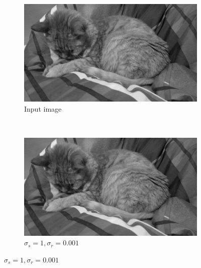 \documentclass[a4spaper]{article}
\begin{document}
\begin{figure}[ht]
	\begin{subfigure}[h]{0.48\textwidth}
		\centering
		\includegraphics[width=\textwidth]{jerry_gray}
		\caption*{Input image}
	\end{subfigure}
	~
	\begin{subfigure}[h]{0.48\textwidth}
	  \centering
	  \includegraphics[width=\textwidth]{jerry_flt_1_0-001}
	  \caption*{$\sigma_s = 1, \sigma_r = 0.001$}
	\end{subfigure}
	

\end{figure}
\end{document}
